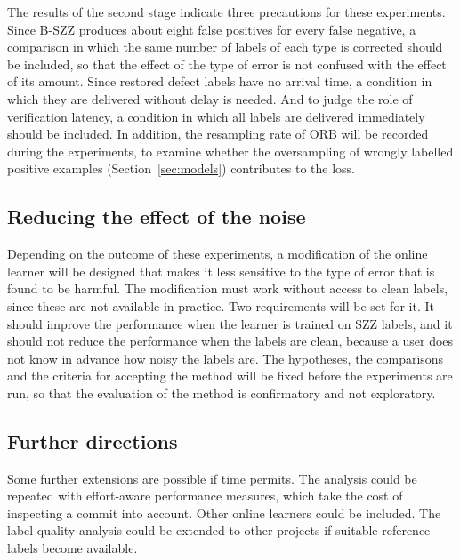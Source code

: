 \documentclass[12pt,a4paper,oneside]{report}
\begin{document}
The results of the second stage indicate three precautions for these
experiments. Since B-SZZ produces about eight false positives for every false
negative, a comparison in which the same number of labels of each type is
corrected should be included, so that the effect of the type of error is not
confused with the effect of its amount. Since restored defect labels have no
arrival time, a condition in which they are delivered without delay is
needed. And to judge the role of verification latency, a condition in which
all labels are delivered immediately should be included. In addition, the
resampling rate of ORB will be recorded during the experiments, to examine
whether the oversampling of wrongly labelled positive examples
(Section~\ref{sec:models}) contributes to the loss.

\subsection{Reducing the effect of the noise}

Depending on the outcome of these experiments, a modification of the online
learner will be designed that makes it less sensitive to the type of error
that is found to be harmful. The modification must work without access to
clean labels, since these are not available in practice. Two requirements
will be set for it. It should improve the performance when the learner is
trained on SZZ labels, and it should not reduce the performance when the
labels are clean, because a user does not know in advance how noisy the
labels are. The hypotheses, the comparisons and the criteria for accepting
the method will be fixed before the experiments are run, so that the
evaluation of the method is confirmatory and not exploratory.

\subsection{Further directions}

Some further extensions are possible if time permits. The analysis could be
repeated with effort-aware performance measures, which take the cost of
inspecting a commit into account. Other online learners could be included.
The label quality analysis could be extended to other projects if suitable
reference labels become available.
\end{document}

